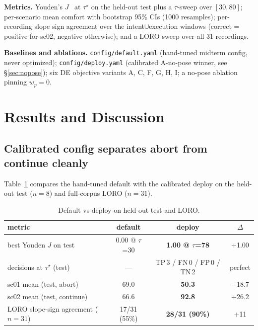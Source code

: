 \documentclass{article}
\newcommand{\code}[1]{\texttt{\small #1}}
\begin{document}
\textbf{Metrics.} Youden's $J$~\cite{ref36} at $\tau^\star$ on the held-out test plus a $\tau$-sweep over $[30, 80]$; per-scenario mean comfort with bootstrap 95\% CIs (1000 resamples); per-recording slope sign agreement over the intent$\cup$execution windows (correct = positive for sc02, negative otherwise); and a LORO sweep over all 31 recordings.

\textbf{Baselines and ablations.} \code{config/default.yaml} (hand-tuned midterm config, never optimized); \code{config/deploy.yaml} (calibrated A-no-pose winner, see \S\ref{sec:nopose}); six DE objective variants A, C, F, G, H, I; a no-pose ablation pinning $w_p = 0$.

\section{Results and Discussion}\label{sec:results}

\subsection{Calibrated config separates abort from continue cleanly}

Table~\ref{tab:headline} compares the hand-tuned default with the calibrated deploy on the held-out test ($n=8$) and full-corpus LORO ($n=31$).

\begin{table}[h]
\centering
\caption{Default vs deploy on held-out test and LORO.}
\label{tab:headline}
\small
\begin{tabular}{@{}lccc@{}}
\toprule
metric & default & deploy & $\Delta$ \\
\midrule
best Youden $J$ on test & 0.00 @ $\tau$=30 & \textbf{1.00 @ $\tau$=78} & +1.00 \\
decisions at $\tau^\star$ (test) & --- & TP\,3 / FN\,0 / FP\,0 / TN\,2 & perfect \\
sc01 mean (test, abort) & 69.0 & \textbf{50.3} & $-$18.7 \\
sc02 mean (test, continue) & 66.6 & \textbf{92.8} & +26.2 \\
LORO slope-sign agreement ($n=31$) & 17/31 (55\%) & \textbf{28/31 (90\%)} & +11 \\
\bottomrule
\end{tabular}
\end{table}
\end{document}
